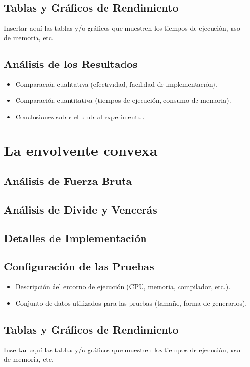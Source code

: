 \documentclass[a4paper,12pt]{article}
\begin{document}
\subsection{Tablas y Gráficos de Rendimiento}
Insertar aquí las tablas y/o gráficos que muestren los tiempos de ejecución,
uso de memoria, etc.

\subsection{Análisis de los Resultados}
\begin{itemize}
	\item Comparación cualitativa (efectividad, facilidad de implementación).
	\item Comparación cuantitativa (tiempos de ejecución, consumo de memoria).
	\item Conclusiones sobre el umbral experimental.
\end{itemize}


\section{La envolvente convexa}
\subsection{Análisis de Fuerza Bruta}

\subsection{Análisis de Divide y Vencerás}

\subsection{Detalles de Implementación}

\subsection{Configuración de las Pruebas}
\begin{itemize}
	\item Descripción del entorno de ejecución (CPU, memoria, compilador, etc.).
	\item Conjunto de datos utilizados para las pruebas (tamaño, forma de generarlos).
\end{itemize}

\subsection{Tablas y Gráficos de Rendimiento}
Insertar aquí las tablas y/o gráficos que muestren los tiempos de ejecución,
uso de memoria, etc.
\end{document}
